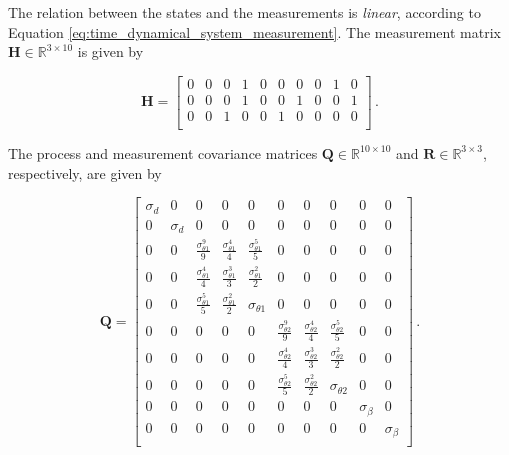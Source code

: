 The relation between the states and the measurements is \emph{linear}, according to Equation \ref{eq:time_dynamical_system_measurement}. The measurement matrix $\mathbf{H} \in \mathbb{R}^{3 \times 10}$ is given by 

\begin{equation}
\mathbf{H} = \begin{bmatrix}
  0 & 0 & 0 & 1 & 0 & 0 & 0 & 0 & 1 & 0\\
  0 & 0 & 0 & 1 & 0 & 0 & 1 & 0 & 0 & 1\\
  0 & 0 & 1 & 0 & 0 & 1 & 0 & 0 & 0 & 0\\
\end{bmatrix}\,.
\end{equation}

The process and measurement covariance matrices $\mathbf{Q} \in \mathbb{R}^{10 \times 10}$ and $\mathbf{R} \in \mathbb{R}^{3 \times 3}$, respectively, are given by

\begin{equation}
\mathbf{Q} = \begin{bmatrix}
  \sigma_d & 0 & 0 & 0 & 0 & 0 & 0 & 0 & 0 & 0\\
  0 & \sigma_d & 0 & 0 & 0 & 0 & 0 & 0 & 0 & 0\\
  0 & 0 & \frac{\sigma^9_{\theta 1}}{9} & \frac{\sigma^4_{\theta 1}}{4} & \frac{\sigma^5_{\theta 1}}{5} & 0 & 0 & 0 & 0 & 0\\
  0 & 0 & \frac{\sigma^4_{\theta 1}}{4} & \frac{\sigma^3_{\theta 1}}{3} & \frac{\sigma^2_{\theta 1}}{2} & 0 & 0 & 0 & 0 & 0\\
  0 & 0 & \frac{\sigma^5_{\theta 1}}{5} & \frac{\sigma^2_{\theta 1}}{2} & \sigma_{\theta 1} & 0 & 0 & 0 & 0 & 0\\
  0 & 0 & 0 & 0 & 0 & \frac{\sigma^9_{\theta 2}}{9} & \frac{\sigma^4_{\theta 2}}{4} & \frac{\sigma^5_{\theta 2}}{5} & 0 & 0\\
  0 & 0 & 0 & 0 & 0 & \frac{\sigma^4_{\theta 2}}{4} & \frac{\sigma^3_{\theta 2}}{3} & \frac{\sigma^2_{\theta 2}}{2} & 0 & 0\\
  0 & 0 & 0 & 0 & 0 & \frac{\sigma^5_{\theta 2}}{5} & \frac{\sigma^2_{\theta 2}}{2} & \sigma_{\theta 2} & 0 & 0\\
  0 & 0 & 0 & 0 & 0 & 0 & 0 & 0 & \sigma_{\beta} & 0\\
  0 & 0 & 0 & 0 & 0 & 0 & 0 & 0 & 0 & \sigma_{\beta}\\
\end{bmatrix}\,.
\end{equation}

